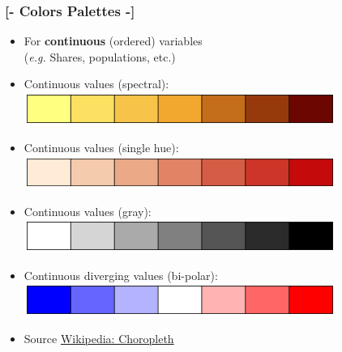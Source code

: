 \documentclass[xcolor=x11names,compress]{beamer}
\renewcommand{\(}{\begin{columns}}
\renewcommand{\)}{\end{columns}}
\newcommand{\<}[1]{\begin{column}{#1}}
\renewcommand{\>}{\end{column}}
\begin{document}
\begin{frame} %
\frametitle{\textcolor{brique}{[-  \textbf{Colors Palettes} -]}}
\begin{center}
\begin{itemize}[<+-|alert@+>]
    \item[] For \textbf{continuous} (ordered) variables\\ (\textit{e.g.} Shares, populations, etc.)
    \item Continuous values (spectral): \hfill \includegraphics[width = 0.8\textwidth]{M5-ColorPalettePartialSpectral.png}
    \item Continuous values (single hue): \hfill \includegraphics[width = 0.8\textwidth]{M5-ColorPaletteSingleHue.png}
    \item Continuous values (gray): \hfill \includegraphics[width = 0.8\textwidth]{M5-ColorPaletteGreyscale.png}
    \item Continuous diverging values (bi-polar): \hfill \includegraphics[width = 0.8\textwidth]{M5-ColorPaletteBiPolar.png}
  \item[] \textcolor{gris}{\footnotesize{Source \href{https://en.wikipedia.org/wiki/Choropleth_map}{Wikipedia: Choropleth}}}
\end{itemize}
\end{center}
\end{frame}
\end{document}
